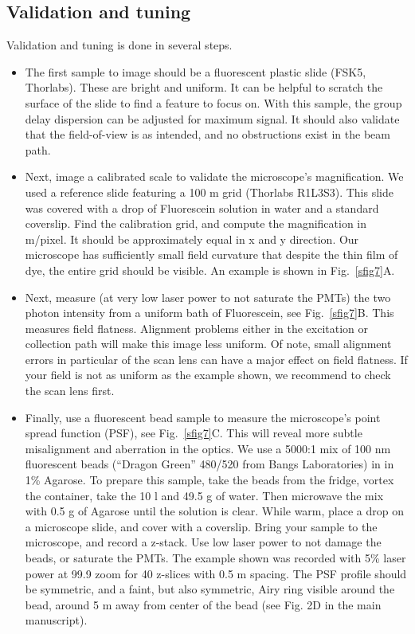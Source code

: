 \documentclass[10pt,letterpaper]{article}
\begin{document}
\subsection{Validation and tuning}
%
Validation and tuning is done in several steps.
\begin{itemize}
    \item The first sample to image should be a fluorescent plastic slide (FSK5, Thorlabs). These are bright and uniform. It can be helpful to scratch the surface of the slide to find a feature to focus on. With this sample, the group delay dispersion can be adjusted for maximum signal. It should also validate that the field-of-view is as intended, and no obstructions exist in the beam path.
    \item Next, image a calibrated scale to validate the microscope's magnification. We used a reference slide featuring a 100 \textmu m grid (Thorlabs R1L3S3). This slide was covered with a drop of Fluorescein solution in water and a standard coverslip. Find the calibration grid, and compute the magnification in \textmu m/pixel. It should be approximately equal in x and y direction. Our microscope has sufficiently small field curvature that despite the thin film of dye, the entire grid should be visible. An example is shown in Fig.~\ref{sfig7}A.
    \item Next, measure (at very low laser power to not saturate the PMTs) the two photon intensity from a uniform bath of Fluorescein, see Fig.~\ref{sfig7}B. This measures field flatness. Alignment problems either in the excitation or collection path will make this image less uniform. Of note, small alignment errors in particular of the scan lens can have a major effect on field flatness. If your field is not as uniform as the example shown, we recommend to check the scan lens first.
    \item Finally, use a fluorescent bead sample to measure the microscope's point spread function (PSF), see Fig.~\ref{sfig7}C. This will reveal more subtle misalignment and aberration in the optics. We use a 5000:1 mix of 100 nm fluorescent beads (``Dragon Green'' 480/520 from Bangs Laboratories) in in 1\% Agarose. To prepare this sample, take the beads from the fridge, vortex the container, take the 10 \textmu l and 49.5 g of water. Then microwave the mix with 0.5 g of Agarose until the solution is clear. While warm, place a drop on a microscope slide, and cover with a coverslip. Bring your sample to the microscope, and record a z-stack. Use low laser power to not damage the beads, or saturate the PMTs. The example shown was recorded with 5\% laser power at 99.9 zoom for 40 z-slices with 0.5 \textmu m spacing. The PSF profile should be symmetric, and a faint, but also symmetric, Airy ring visible around the bead, around 5 \textmu m away from center of the bead (see Fig. 2D in the main manuscript).
\end{itemize}
\end{document}
